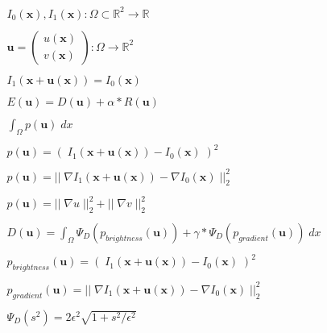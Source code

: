 \documentclass[11pt]{article}
\newcommand{\mat}[1]{\begin{pmatrix} #1 \end{pmatrix}}
\newcommand{\Real}{\mathbb{R}}
\newcommand{\flow}{\boldsymbol{u}}
\newcommand{\x}{\boldsymbol{x}}
\begin{document}
\begin{align*}
& I_0(\x),I_1(\x) : \Omega \subset \Real^2 \rightarrow \Real
\\\\
& \flow = \mat{u(\x)\\v(\x)} : \Omega \rightarrow \Real^2
\\\\
&I_1(\x+\flow(\x))=I_0(\x)
\\\\
&E(\flow)=D(\flow)+\alpha*R(\flow)
\\\\
&\int_\Omega p(\flow)\;dx
\\\\
&p(\flow) = (\;I_1(\x+\flow(\x))-I_0(\x)\;)^2
\\\\
&p(\flow) = ||\;\nabla I_1(\x+\flow(\x))-\nabla I_0(\x)\;||_2^2
\\\\
&p(\flow)= ||\;\nabla u\;||_2^2 + ||\;\nabla v\;||_2^2
\\\\
&D(\flow) = \int_\Omega \Psi_D(p_{brightness}(\flow)) + \gamma*\Psi_D(p_{gradient}(\flow))\;dx
\\\\
&p_{brightness}(\flow) = (\;I_1(\x+\flow(\x))-I_0(\x)\;)^2
\\\\
&p_{gradient}(\flow) = ||\;\nabla I_1(\x+\flow(\x))-\nabla I_0(\x)\;||_2^2
\\\\
&\Psi_D(s^2) = 2\epsilon^2\sqrt{1+s^2/\epsilon^2}
\end{align*}
\end{document}
